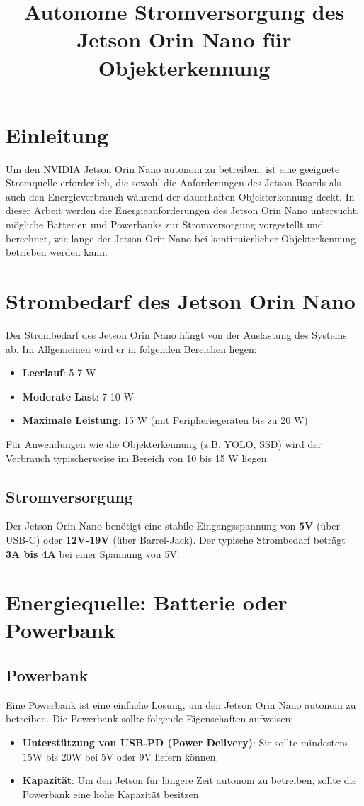 \documentclass[12pt]{article}
\title{Autonome Stromversorgung des Jetson Orin Nano für Objekterkennung}
\author{}
\date{}
\begin{document}
\maketitle

\section{Einleitung}
Um den NVIDIA Jetson Orin Nano autonom zu betreiben, ist eine geeignete Stromquelle erforderlich, die sowohl die Anforderungen des Jetson-Boards als auch den Energieverbrauch während der dauerhaften Objekterkennung deckt. In dieser Arbeit werden die Energieanforderungen des Jetson Orin Nano untersucht, mögliche Batterien und Powerbanks zur Stromversorgung vorgestellt und berechnet, wie lange der Jetson Orin Nano bei kontinuierlicher Objekterkennung betrieben werden kann.

\section{Strombedarf des Jetson Orin Nano}
Der Strombedarf des Jetson Orin Nano hängt von der Auslastung des Systems ab. Im Allgemeinen wird er in folgenden Bereichen liegen:

\begin{itemize}
    \item \textbf{Leerlauf}: 5-7 W
    \item \textbf{Moderate Last}: 7-10 W
    \item \textbf{Maximale Leistung}: 15 W (mit Peripheriegeräten bis zu 20 W)
\end{itemize}

Für Anwendungen wie die Objekterkennung (z.B. YOLO, SSD) wird der Verbrauch typischerweise im Bereich von 10 bis 15 W liegen.

\subsection{Stromversorgung}
Der Jetson Orin Nano benötigt eine stabile Eingangsspannung von \textbf{5V} (über USB-C) oder \textbf{12V-19V} (über Barrel-Jack). Der typische Strombedarf beträgt \textbf{3A bis 4A} bei einer Spannung von 5V.

\section{Energiequelle: Batterie oder Powerbank}

\subsection{Powerbank}
Eine Powerbank ist eine einfache Lösung, um den Jetson Orin Nano autonom zu betreiben. Die Powerbank sollte folgende Eigenschaften aufweisen:
\begin{itemize}
    \item \textbf{Unterstützung von USB-PD (Power Delivery)}: Sie sollte mindestens 15W bis 20W bei 5V oder 9V liefern können.
    \item \textbf{Kapazität}: Um den Jetson für längere Zeit autonom zu betreiben, sollte die Powerbank eine hohe Kapazität besitzen.
\end{itemize}
\end{document}
